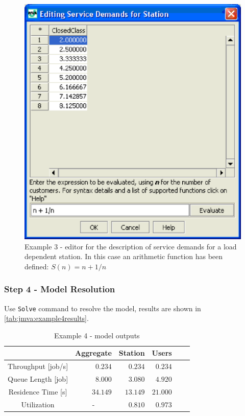 \begin{figure}[htbp]
    \begin{center}
        \includegraphics[scale=.5]{img/jmva/example3ldAfter}
    \end{center}
    \caption{Example 3 - editor for the description of service
    demands for a load dependent station. In this case an arithmetic function
    has been defined: $S(n)=n+1/n$}
    \label{fig:jmva:example3ldAfter}
\end{figure}

\subsubsection{Step 4 - Model Resolution}

Use \texttt{Solve} command to resolve the model, results are shown
in \autoref{tab:jmva:example4results}.

\begin{table}[htbp]
\begin{center}
\begin{tabular}{c|r|r|r|r|r|}
& \multicolumn{1}{c|}{Aggregate} & \multicolumn{1}{c|}{Station} & \multicolumn{1}{c|}{Users}\\
\hline
Throughput [job/s] & $0.234$ & $0.234$ & $0.234$ \\
Queue Length [job]& $8.000$ & $3.080$ & $4.920$ \\
Residence Time [s]& $34.149$ & $13.149$ & $21.000$ \\
Utilization & \multicolumn{1}{c|}{-} & $0.810$ & $0.973$ \\
\hline
\end{tabular}
\end{center}
\caption{Example 4 - model outputs} \label{tab:jmva:example4results}
\end{table}

